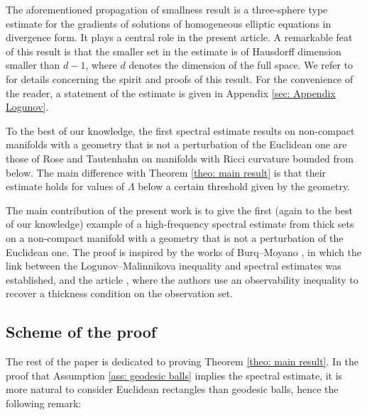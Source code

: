 \documentclass[letterpaper,11pt]{amsart}
\theoremstyle{note}
\numberwithin{equation}{section}
\begin{document}
The aforementioned propagation of smallness result \cite[Theorem 5.1]{logunovmalinnikova2018qtttve_propag_smallness} is a three-sphere type estimate for the gradients of solutions of homogeneous elliptic equations in divergence form. It plays a central role in the present article. A remarkable feat of this result is that the smaller set in the estimate is of Hausdorff dimension smaller than $d-1$, where $d$ denotes the dimension of the full space. We refer to \cite{logunov2018nodalpolynomial,logunov2018nodalnadirashvili,logunovmalinnikova2018qtttve_propag_smallness} for details concerning the spirit and proofs of this result. For the convenience of the reader, a statement of the estimate is given in Appendix \ref{sec: Appendix Logunov}.

To the best of our knowledge, the first spectral estimate results on non-compact manifolds with a geometry that is not a perturbation of the Euclidean one are those of Rose and Tautenhahn \cite{rosetautenhahn2023unique} on manifolds with Ricci curvature bounded from below. The main difference with Theorem \ref{theo: main result} is that their estimate holds for values of $\Lambda$ below a certain threshold given by the geometry.

The main contribution of the present work is to give the first (again to the best of our knowledge) example of a high-frequency spectral estimate from thick sets on a non-compact manifold with a geometry that is not a perturbation of the Euclidean one. The proof is inspired by the works of Burq--Moyano \cite{burqmoyano2023propagationheat, burqmoyano2021spectralestimates}, in which the link between the Logunov--Malinnikova inequality and spectral estimates was established, and the article \cite{wangwangzhangzhang2019spectralineq_heat}, where the authors use an observability inequality to recover a thickness condition on the observation set.

\subsection{Scheme of the proof}

The rest of the paper is dedicated to proving Theorem \ref{theo: main result}. In the proof that Assumption \ref{ass: geodesic balls} implies the spectral estimate, it is more natural to consider Euclidean rectangles than geodesic balls, hence the following remark: 

\medskip
\end{document}
